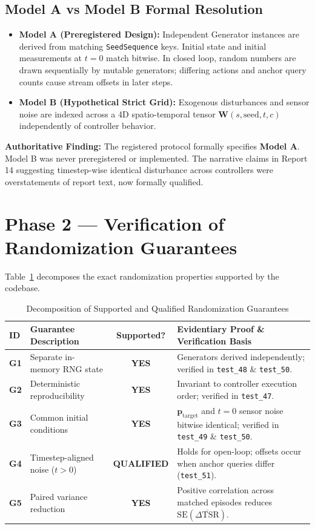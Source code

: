 \documentclass[10pt,a4paper]{article}
\begin{document}
\subsection{Model A vs Model B Formal Resolution}
\begin{itemize}
    \item \textbf{Model A (Preregistered Design):} Independent Generator instances are derived from matching \texttt{SeedSequence} keys. Initial state and initial measurements at $t=0$ match bitwise. In closed loop, random numbers are drawn sequentially by mutable generators; differing actions and anchor query counts cause stream offsets in later steps.
    \item \textbf{Model B (Hypothetical Strict Grid):} Exogenous disturbances and sensor noise are indexed across a 4D spatio-temporal tensor $\mathbf{W}(s, \text{seed}, t, c)$ independently of controller behavior.
\end{itemize}
\textbf{Authoritative Finding:} The registered protocol formally specifies \textbf{Model A}. Model B was never preregistered or implemented. The narrative claims in Report 14 suggesting timestep-wise identical disturbance across controllers were overstatements of report text, now formally qualified.

\section{Phase 2 — Verification of Randomization Guarantees}

Table~\ref{tab:guarantees} decomposes the exact randomization properties supported by the codebase.

\begin{table}[htbp]
\centering
\small
\caption{Decomposition of Supported and Qualified Randomization Guarantees}
\label{tab:guarantees}
\begin{tabularx}{\textwidth}{lp{4.5cm}cp{5.5cm}}
\toprule
\textbf{ID} & \textbf{Guarantee Description} & \textbf{Supported?} & \textbf{Evidentiary Proof \& Verification Basis} \\
\midrule
\textbf{G1} & Separate in-memory RNG state & \textbf{YES} & Generators derived independently; verified in \texttt{test\_48} \& \texttt{test\_50}. \\
\textbf{G2} & Deterministic reproducibility & \textbf{YES} & Invariant to controller execution order; verified in \texttt{test\_47}. \\
\textbf{G3} & Common initial conditions & \textbf{YES} & $\mathbf{p}_{\mathrm{target}}$ and $t=0$ sensor noise bitwise identical; verified in \texttt{test\_49} \& \texttt{test\_50}. \\
\textbf{G4} & Timestep-aligned noise ($t > 0$) & \textbf{QUALIFIED} & Holds for open-loop; offsets occur when anchor queries differ (\texttt{test\_51}). \\
\textbf{G5} & Paired variance reduction & \textbf{YES} & Positive correlation across matched episodes reduces $\mathrm{SE}(\overline{\Delta\mathrm{TSR}})$. \\
\bottomrule
\end{tabularx}
\end{table}
\end{document}
